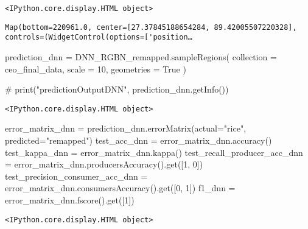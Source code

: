 \documentclass[
  letterpaper,
  DIV=11,
  numbers=noendperiod]{scrreprt}
\newenvironment{Shaded}{\begin{snugshade}}{\end{snugshade}}
\newcommand{\CommentTok}[1]{\textcolor[rgb]{0.37,0.37,0.37}{#1}}
\newcommand{\DecValTok}[1]{\textcolor[rgb]{0.68,0.00,0.00}{#1}}
\newcommand{\NormalTok}[1]{\textcolor[rgb]{0.00,0.23,0.31}{#1}}
\newcommand{\OperatorTok}[1]{\textcolor[rgb]{0.37,0.37,0.37}{#1}}
\newcommand{\StringTok}[1]{\textcolor[rgb]{0.13,0.47,0.30}{#1}}
\newcommand{\VariableTok}[1]{\textcolor[rgb]{0.07,0.07,0.07}{#1}}
\begin{document}
\begin{verbatim}
<IPython.core.display.HTML object>
\end{verbatim}

\begin{verbatim}
Map(bottom=220961.0, center=[27.37845188654284, 89.42005507220328], controls=(WidgetControl(options=['position…
\end{verbatim}

\begin{Shaded}
\begin{Highlighting}[]
\NormalTok{prediction\_dnn }\OperatorTok{=}\NormalTok{ DNN\_RGBN\_remapped.sampleRegions(}
\NormalTok{    collection }\OperatorTok{=}\NormalTok{ ceo\_final\_data,}
\NormalTok{    scale }\OperatorTok{=} \DecValTok{10}\NormalTok{,}
\NormalTok{    geometries }\OperatorTok{=} \VariableTok{True}
\NormalTok{)}

\CommentTok{\# print("predictionOutputDNN", prediction\_dnn.getInfo())}
\end{Highlighting}
\end{Shaded}

\begin{verbatim}
<IPython.core.display.HTML object>
\end{verbatim}

\begin{Shaded}
\begin{Highlighting}[]
\NormalTok{error\_matrix\_dnn }\OperatorTok{=}\NormalTok{ prediction\_dnn.errorMatrix(actual}\OperatorTok{=}\StringTok{"rice"}\NormalTok{, predicted}\OperatorTok{=}\StringTok{"remapped"}\NormalTok{)}
\NormalTok{test\_acc\_dnn }\OperatorTok{=}\NormalTok{ error\_matrix\_dnn.accuracy()}
\NormalTok{test\_kappa\_dnn }\OperatorTok{=}\NormalTok{ error\_matrix\_dnn.kappa()}
\NormalTok{test\_recall\_producer\_acc\_dnn }\OperatorTok{=}\NormalTok{ error\_matrix\_dnn.producersAccuracy().get([}\DecValTok{1}\NormalTok{, }\DecValTok{0}\NormalTok{])}
\NormalTok{test\_precision\_consumer\_acc\_dnn }\OperatorTok{=}\NormalTok{ error\_matrix\_dnn.consumersAccuracy().get([}\DecValTok{0}\NormalTok{, }\DecValTok{1}\NormalTok{])}
\NormalTok{f1\_dnn }\OperatorTok{=}\NormalTok{ error\_matrix\_dnn.fscore().get([}\DecValTok{1}\NormalTok{])}
\end{Highlighting}
\end{Shaded}

\begin{verbatim}
<IPython.core.display.HTML object>
\end{verbatim}
\end{document}
